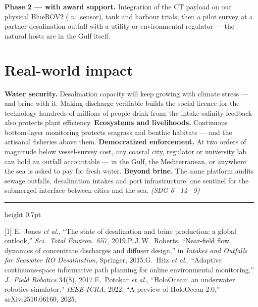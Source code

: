 \documentclass[10pt,a4paper]{article}
\newcommand{\keyword}[1]{\textbf{\color{deepblue}#1}}
\begin{document}
\textbf{Phase 2 --- with award support.} Integration of the CT payload on our physical BlueROV2 (${\approx}$ sensor), tank and harbour trials, then a pilot survey at a partner desalination outfall with a utility or environmental regulator --- the natural hosts are in the Gulf itself.

\section{Real-world impact}
\keyword{Water security.} Desalination capacity will keep growing with climate stress --- and brine with it. Making discharge verifiable builds the social licence for the technology hundreds of millions of people drink from; the intake-salinity feedback also protects plant efficiency.
\keyword{Ecosystems and livelihoods.} Continuous bottom-layer monitoring protects seagrass and benthic habitats --- and the artisanal fisheries above them.
\keyword{Democratized enforcement.} At two orders of magnitude below vessel-survey cost, any coastal city, regulator or university lab can hold an outfall accountable --- in the Gulf, the Mediterranean, or anywhere the sea is asked to pay for fresh water.
\keyword{Beyond brine.} The same platform audits sewage outfalls, desalination intakes and port infrastructure: one sentinel for the submerged interface between cities and the sea. \emph{(SDG 6 \textperiodcentered\ 14 \textperiodcentered\ 9)}

\vspace{2pt}
{\color{deepblue}\hrule height 0.7pt}
\vspace{3pt}
{\footnotesize
[1] E.~Jones \emph{et al.}, ``The state of desalination and brine production: a global outlook,'' \emph{Sci.\ Total Environ.}\ 657, 2019.\;
[2] P.\,J.\,W.~Roberts, ``Near-field flow dynamics of concentrate discharges and diffuser design,'' in \emph{Intakes and Outfalls for Seawater RO Desalination}, Springer, 2015.\;
[3] G.~Hitz \emph{et al.}, ``Adaptive continuous-space informative path planning for online environmental monitoring,'' \emph{J.\ Field Robotics} 34(8), 2017.\;
[4] E.~Potokar \emph{et al.}, ``HoloOcean: an underwater robotics simulator,'' \emph{IEEE ICRA}, 2022; ``A preview of HoloOcean 2.0,'' arXiv:2510.06160, 2025.
}
\end{document}
